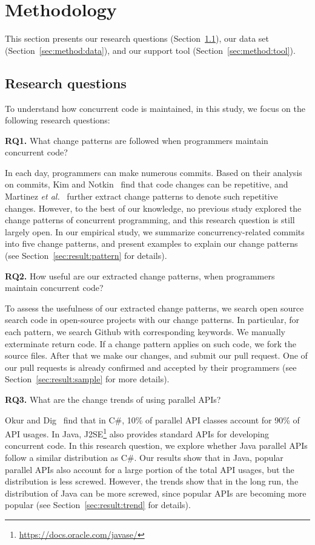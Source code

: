 \section{Methodology}
\label{sec:method}
This section presents our research questions (Section~\ref{sec:method:rq}), our data set (Section~\ref{sec:method:data}), and our support tool (Section~\ref{sec:method:tool}).
\subsection{Research questions}
\label{sec:method:rq}
To understand how concurrent code is maintained, in this study, we focus on the following research questions:

\textbf{RQ1.} What change patterns are followed when programmers maintain concurrent code?

In each day, programmers can make numerous commits. Based on their analysis on commits, Kim and Notkin~\cite{conf/icse/KimN09} find that code changes can be repetitive, and Martinez \emph{et al.}~\cite{conf/icsm/MartinezDM13} further extract change patterns to denote such repetitive changes. However, to the best of our knowledge, no previous study explored the change patterns of concurrent programming, and this research question is still largely open. In our empirical study, we summarize concurrency-related commits into five change patterns, and present examples to explain our change patterns (see Section~\ref{sec:result:pattern} for details).

\textbf{RQ2.} How useful are our extracted change patterns, when programmers maintain concurrent code?

To assess the usefulness of our extracted change patterns, we search open source search code in open-source projects with our change patterns. In particular, for each pattern, we search Github with corresponding keywords. We manually exterminate return code. If a change pattern applies on such code, we fork the source files. After that we make our changes, and submit our pull request. One of our pull requests is already confirmed and accepted by their programmers (see Section~\ref{sec:result:sample} for more details).

\textbf{RQ3.} What are the change trends of using parallel APIs?

Okur and Dig~\cite{conf/sigsoft/OkurD12} find that in C\#, 10\% of parallel API classes account for 90\% of API usages. In Java, J2SE\footnote{\url{https://docs.oracle.com/javase/}} also provides standard APIs for developing concurrent code. In this research question, we explore whether Java parallel APIs follow a similar distribution as C\#. Our results show that in Java, popular parallel APIs also account for a large portion of the total API usages, but the distribution is less screwed. However, the trends show that in the long run, the distribution of Java can be more screwed, since popular APIs are becoming more popular (see Section~\ref{sec:result:trend} for details).

